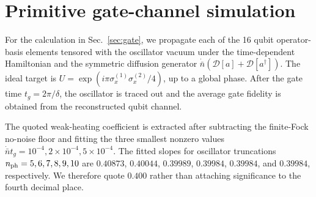 \documentclass[aps,pra,twocolumn,superscriptaddress,longbibliography,nofootinbib,floatfix]{revtex4-2}
\theoremstyle{remark}
\begin{document}
\section{Primitive gate-channel simulation}
\label{app:gate}

For the calculation in Sec.~\ref{sec:gate}, we propagate each of the 16 qubit operator-basis elements tensored with the oscillator vacuum under the time-dependent Hamiltonian and the symmetric diffusion generator $\dot{\bar n}(\mathcal D[a]+\mathcal D[a^\dagger])$.  The ideal target is $U=\exp(i\pi\sigma_x^{(1)}\sigma_x^{(2)}/4)$, up to a global phase.  After the gate time $t_g=2\pi/\delta$, the oscillator is traced out and the average gate fidelity is obtained from the reconstructed qubit channel.

The quoted weak-heating coefficient is extracted after subtracting the finite-Fock no-noise floor and fitting the three smallest nonzero values $\dot{\bar n}t_g=10^{-4},2\times10^{-4},5\times10^{-4}$.  The fitted slopes for oscillator truncations $n_{\rm ph}=5,6,7,8,9,10$ are $0.40873$, $0.40044$, $0.39989$, $0.39984$, $0.39984$, and $0.39984$, respectively.  We therefore quote $0.400$ rather than attaching significance to the fourth decimal place.
\end{document}
